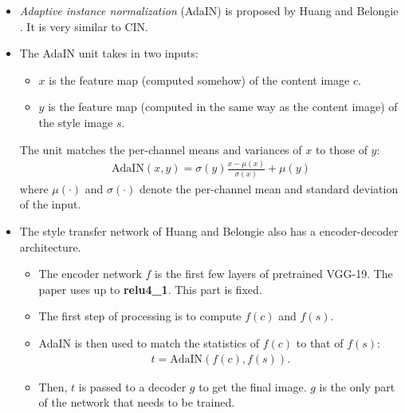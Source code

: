 \documentclass[10pt]{article}
\begin{document}
  \begin{itemize}
  	\item \emph{Adaptive instance normalization} (AdaIN) is proposed by Huang and Belongie \cite{Huang:2017}. It is very similar to CIN.

  	\item The AdaIN unit takes in two inputs:
  	\begin{itemize}
  		\item $x$ is the feature map (computed somehow) of the content image $c$.
  		\item $y$ is the feature map (computed in the same way as the content image) of the style image $s$.
  	\end{itemize}
  	The unit matches the per-channel means and variances of $x$ to those of $y$:
  	\begin{align*}
  	 	\mathrm{AdaIN}(x,y) = \sigma(y) \frac{x - \mu(x)}{\sigma(x)} + \mu(y)
  	 \end{align*}
  	 where $\mu(\cdot)$ and $\sigma(\cdot)$ denote the per-channel mean and standard deviation of the input.

  	\item The style transfer network of Huang and Belongie also has a encoder-decoder architecture.

  	\begin{itemize}
  		\item The encoder network $f$ is the first few layers of pretrained VGG-19. The paper uses up to \textbf{relu4\_1}. This part is fixed.

  		\item The first step of processing is to compute $f(c)$ and $f(s)$.

  		\item AdaIN is then used to match the statistics of $f(c)$ to that of $f(s)$:
  		\begin{align*}
  			t = \mathrm{AdaIN}(f(c), f(s)).
  		\end{align*}

  		\item Then, $t$ is passed to a decoder $g$ to get the final image. $g$ is the only part of the network that needs to be trained.
  	\end{itemize}


\end{itemize}
\end{document}
